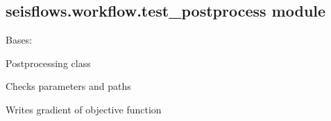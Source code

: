 \documentclass[letterpaper,10pt,english]{sphinxmanual}
\begin{document}
\subsection{seisflows.workflow.test\_postprocess module}
\label{\detokenize{ref/seisflows.workflow:module-seisflows.workflow.test_postprocess}}\label{\detokenize{ref/seisflows.workflow:seisflows-workflow-test-postprocess-module}}

\begin{fulllineitems}
\label{\detokenize{ref/seisflows.workflow:seisflows.workflow.test_postprocess.test_postprocess}}
Bases: {\hyperref[\detokenize{ref/seisflows.workflow:seisflows.workflow.base.base}]{}}

Postprocessing class

\begin{fulllineitems}
\label{\detokenize{ref/seisflows.workflow:seisflows.workflow.test_postprocess.test_postprocess.check}}
Checks parameters and paths

\end{fulllineitems}


\begin{fulllineitems}
\label{\detokenize{ref/seisflows.workflow:seisflows.workflow.test_postprocess.test_postprocess.main}}
Writes gradient of objective function

\end{fulllineitems}


\end{fulllineitems}
\end{document}
